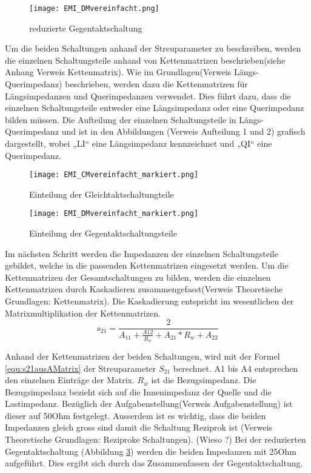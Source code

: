 \begin{figure}[H]
		\centering
		\texttt{[image: EMI\_DMvereinfacht.png]}
		\label{fig:dmschaltungvereinfacht}
		\caption{reduzierte Gegentaktschaltung}
\end{figure}
\newpage
Um die beiden Schaltungen anhand der Streuparameter zu beschreiben, werden die einzelnen Schaltungsteile anhand von Kettenmatrizen beschrieben(siehe Anhang Verweis Kettenmatrix). Wie im Grundlagen(Verweis Längs- Querimpedanz) beschrieben, werden dazu die Kettenmatrizen für Längsimpedanzen und Querimpedanzen verwendet. Dies führt dazu, dass die einzelnen Schaltungsteile entweder eine Längsimpedanz oder eine Querimpedanz bilden müssen. Die Aufteilung der einzelnen Schaltungsteile in Längs-Querimpedanz und ist in den Abbildungen (Verweis Aufteilung 1 und 2) grafisch dargestellt, wobei „LI“ eine Längsimpedanz kennzeichnet und „QI“ eine Querimpedanz.
\begin{figure}[H]
		\centering
		\texttt{[image: EMI\_CMvereinfacht\_markiert.png]}
		\label{fig:cmschaltung}
		\caption{Einteilung der Gleichtaktschaltungteile}
\end{figure}

\begin{figure}[H]
		\centering
		\texttt{[image: EMI\_DMvereinfacht\_markiert.png]}
		\label{fig:dmschaltung}
		\caption{Einteilung der Gegentaktschaltungsteile}
\end{figure}

Im nächsten Schritt werden die Impedanzen der einzelnen Schaltungsteile gebildet, welche in die passenden Kettenmatrizen eingesetzt werden. Um die Kettenmatrizen der Gesamtschaltungen zu bilden, werden die einzelnen Kettenmatrizen durch Kaskadieren zusammengefasst(Verweis Theoretische Grundlagen: Kettenmatrix). Die Kaskadierung entspricht im wesentlichen der Matrixmultiplikation der Kettenmatrizen. \\

\begin{equation}\label{equ:s21ausAMatrix}
s_{21} = \frac{2}{A_{11}+\frac{A{12}}{R_w}+A_{21}*R_w+A_{22}}
\end{equation}

Anhand der Kettenmatrizen der beiden Schaltungen, wird mit der Formel \ref{equ:s21ausAMatrix} der Streuparameter $S_{21}$ berechnet. A1 bis A4 entsprechen den einzelnen Einträge der Matrix. $R_w$ ist die Bezugsimpedanz. Die Bezugsimpedanz bezieht sich auf die Innenimpedanz der Quelle und die Lastimpedanz. Bezüglich der Aufgabenstellung(Verweis Aufgabenstellung) ist dieser auf 50Ohm festgelegt. Ausserdem ist es wichtig, dass die beiden Impedanzen gleich gross sind damit die Schaltung Reziprok ist (Verweis Theoretische Grundlagen: Reziproke Schaltungen). (Wieso ?) 
Bei der reduzierten Gegentaktschaltung (Abbildung \ref{fig:dmschaltung}) werden die beiden Impedanzen mit 25Ohm aufgeführt. Dies ergibt sich durch das Zusammenfassen der Gegentaktschaltung.\\


